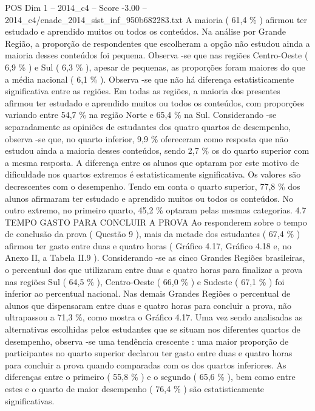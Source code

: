\begin{textsample}{POS Dim 1 – 2014\_c4 – Score -3.00 – 2014\_c4/enade\_2014\_sist\_inf\_950b682283.txt}
A maioria ( 61,4 \% ) afirmou ter estudado e aprendido muitos ou todos os conteúdos.
Na análise por Grande Região, a proporção de respondentes que escolheram a opção não estudou ainda a maioria desses conteúdos foi pequena.
Observa -se que nas regiões Centro-Oeste ( 6,9 \% ) e Sul ( 6,3 \% ), apesar de pequenas, as proporções foram maiores do que a média nacional ( 6,1 \% ).
Observa -se que não há diferença estatisticamente significativa entre as regiões.
Em todas as regiões, a maioria dos presentes afirmou ter estudado e aprendido muitos ou todos os conteúdos, com proporções variando entre 54,7 \% na região Norte e 65,4 \% na Sul.
Considerando -se separadamente as opiniões de estudantes dos quatro quartos de desempenho, observa -se que, no quarto inferior, 9,9 \% ofereceram como resposta que não estudou ainda a maioria desses conteúdos, sendo 2,7 \% os do quarto superior com a mesma resposta.
A diferença entre os alunos que optaram por este motivo de dificuldade nos quartos extremos é estatisticamente significativa.
Os valores são decrescentes com o desempenho.
Tendo em conta o quarto superior, 77,8 \% dos alunos afirmaram ter estudado e aprendido muitos ou todos os conteúdos.
No outro extremo, no primeiro quarto, 45,2 \% optaram pelas mesmas categorias. 4.7 TEMPO GASTO PARA CONCLUIR A PROVA Ao responderem sobre o tempo de conclusão da prova ( Questão 9 ), mais da metade dos estudantes ( 67,4 \% ) afirmou ter gasto entre duas e quatro horas ( Gráfico 4.17, Gráfico 4.18 e, no Anexo II, a Tabela II.9 ).
Considerando -se as cinco Grandes Regiões brasileiras, o percentual dos que utilizaram entre duas e quatro horas para finalizar a prova nas regiões Sul ( 64,5 \% ), Centro-Oeste ( 66,0 \% ) e Sudeste ( 67,1 \% ) foi inferior ao percentual nacional.
Nas demais Grandes Regiões o percentual de alunos que dispensaram entre duas e quatro horas para concluir a prova, não ultrapassou a 71,3 \%, como mostra o Gráfico 4.17.
Uma vez sendo analisadas as alternativas escolhidas pelos estudantes que se situam nos diferentes quartos de desempenho, observa -se uma tendência crescente : uma maior proporção de participantes no quarto superior declarou ter gasto entre duas e quatro horas para concluir a prova quando comparadas com os dos quartos inferiores.
As diferenças entre o primeiro ( 55,8 \% ) e o segundo ( 65,6 \% ), bem como entre estes e o quarto de maior desempenho ( 76,4 \% ) são estatisticamente significativas.

\end{textsample}
